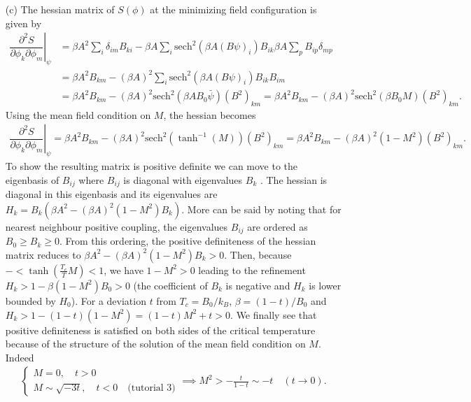 \documentclass[10pt, a4paper]{article}
\begin{document}
{\begin{enumerate}
  \item[(c)]  The hessian matrix of $S(\phi)$ at the minimizing field configuration is given by 
  \begin{align*}
    \left.\dfrac{\partial^2 S}{\partial \phi_k \partial \phi_m}\right|_{\psi} &= \beta A^2 \sum_{i} \delta_{im} B_{ki}-\beta A \sum_i \text{sech}^2 \left(\beta A(B \psi)_i\right) B_{ik} \beta A \sum_{p}B_{i p} \delta_{mp} \\
    &= \beta A^2  B_{km}-(\beta A)^2 \sum_i \text{sech}^2 \left(\beta A(B \psi)_i\right) B_{ik} B_{i m} \\
    &= \beta A^2  B_{km}-(\beta A)^2 \text{sech}^2 \left(\beta A B_0 \bar{\psi}\right) (B^2)_{k m} = \beta A^2  B_{km}-(\beta A)^2 \text{sech}^2 \left(\beta B_0 M\right) (B^2)_{k m}.
  \end{align*}
  Using the mean field condition on $M$, the hessian becomes 
  \begin{align*}
    \left.\dfrac{\partial^2 S}{\partial \phi_k \partial \phi_m}\right|_{\psi} = \beta A^2  B_{km}-(\beta A)^2 \text{sech}^2 \left(\tanh^{-1}(M)\right) (B^2)_{k m} = \beta A^2  B_{km}-(\beta A)^2 (1-M^2) (B^2)_{k m}.
  \end{align*}
  To show the resulting matrix is positive definite we can move to the eigenbasis of $B_{ij}$ where $B_{ij}$ is diagonal with eigenvalues $B_k$ \cite{CitekeyBook}. The hessian is diagonal in this eigenbasis and its eigenvalues are $H_k = B_k(\beta A^2 -(\beta A)^2 (1-M^2) B_k)$. More can be said by noting that for nearest neighbour positive coupling, the eigenvalues $B_{ij}$ are ordered as $B_0 \ge B_k \ge 0$. From this ordering, the positive definiteness of the hessian matrix reduces to $\beta A^2 -(\beta A)^2 (1-M^2) B_k > 0$. Then, because $- < \tanh \left(\frac{T_c}{T}M\right) < 1$, we have $1-M^2 > 0$ leading to the refinement $H_k > 1 - \beta (1-M^2) B_0 > 0$ (the coefficient of $B_k$ is negative and $H_k$ is lower bounded by $H_0$). For a deviation $t$ from $T_c = B_0/k_B$, $\beta = (1-t)/B_0$ and $H_k > 1 - (1-t) (1-M^2) =  (1-t) M^2 + t> 0$. We finally see that positive definiteness is satisfied on both sides of the critical temperature because of the structure of the solution of the mean field condition on $M$. Indeed
  \begin{align*}
    \begin{cases}
      M = 0, \quad t > 0 \\
      M \sim \sqrt{-3t}, \quad t < 0 \quad \text{(tutorial 3)}
     \end{cases} 
     \implies M^2 > -\frac{t}{1-t} \sim -t \quad (t \to 0).

\end{align*}
\end{enumerate}}
\end{document}
